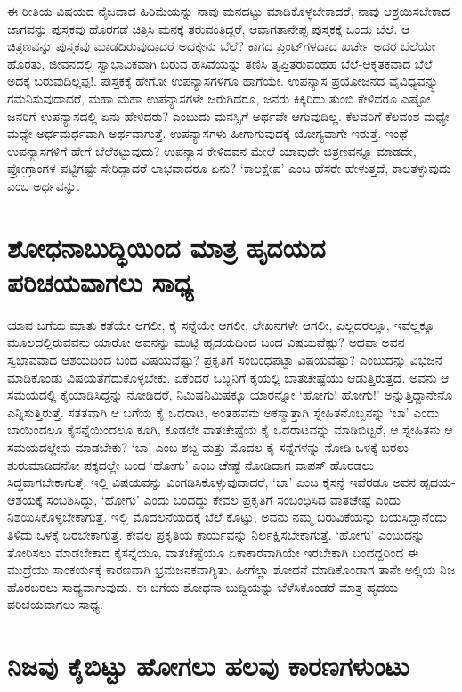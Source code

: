 ಈ ರೀತಿಯ ವಿಷಯದ ನೈಜವಾದ ಹಿರಿಮೆಯನ್ನು ನಾವು ಮನದಟ್ಟು ಮಾಡಿಕೊಳ್ಳಬೇಕಾದರೆ, ನಾವು ಆಶ್ರಯಿಸಬೇಕಾದ ಜಾಗವನ್ನು ಪುಸ್ತಕವು ಹೊರಗಡೆ ಚಿತ್ರಿಸಿ ಮನಕ್ಕೆ ತರುವಂತಿದ್ದರೆ, ಆವಾಗತಾನೇಪ್ಪ ಪುಸ್ತಕಕ್ಕೆ ಒಂದು ಬೆಲೆ. ಆ ಚಿತ್ರಣವನ್ನು ಪುಸ್ತಕವು ಮಾಡದಿರುವುದಾದರೆ ಅದಕ್ಕೇನು ಬೆಲೆ? ಕಾಗದ ಪ್ರಿಂಟ್‌ಗಳದಾದ ಖರ್ಚೇ ಅದರ ಬೆಲೆಯೇ ಹೊರತು, ಜೀವನದಲ್ಲಿ ಸ್ವಾಭಾವಿಕವಾಗಿ ಬರುವ ಹಸಿವೆಯನ್ನು ತಣಿಸಿ ತೃಪ್ತಿತರುವಂಥಹ ಬೆಲೆ-ಆಕೃತಕವಾದ ಬೆಲೆ ಅದಕ್ಕೆ ಬರುವುದಿಲ್ಲಪ್ಪ!. ಪುಸ್ತಕಕ್ಕೆ ಹೇಗೋ ಉಪನ್ಯಾಸಗಳಿಗೂ ಹಾಗೆಯೇ. ಉಪನ್ಯಾಸ ಪ್ರಯೋಜನದ ವೈವಿಧ್ಯವನ್ನ್ನು ಗಮನಿಸುವುದಾದರೆ, ಮಹಾ ಮಹಾ ಉಪನ್ಯಾಸಗಳೇ ಜರುಗಿದರೂ, ಜನರು ಕಿಕ್ಕಿರಿದು ತುಂಬಿ ಕೇಳಿದರೂ ಎಷ್ಟೋ ಜನರಿಗೆ ಉಪನ್ಯಾಸದಲ್ಲಿ ಏನು ಹೇಳಿದರು? ಎಂಬುದು ಮನಸ್ಸಿಗೆ ಅರ್ಥವೇ ಆಗುವುದಿಲ್ಲ. ಕೆಲವರಿಗೆ ಕೆಲವಂಶ ಮಧ್ಯೇ ಮಧ್ಯೇ ಅರ್ಧಮರ್ಧವಾಗಿ ಅರ್ಥವಾಗುತ್ತೆ. ಉಪನ್ಯಾಸಗಳು ಹೀಗಾಗುವುದಕ್ಕೆ ಯೋಗ್ಯವಾಗೇ ಇರುತ್ತೆ. ಇಂಥೆ ಉಪನ್ಯಾಸಗಳಿಗೆ ಹೇಗೆ ಬೆಲೆಕಟ್ಟುವುದು? ಉಪನ್ಯಾಸ ಕೇಳಿದವನ ಮೇಲೆ ಯಾವುದೇ ಚಿತ್ರಣವನ್ನೂ ಮಾಡದೇ, ಪ್ರೋಗ್ರಾಂಗಳ ಪಟ್ಟಿಗಷ್ಟೇ ಸೇರಿದ್ದಾದರೆ ಲಾಭವಾದರೂ ಏನು? `ಕಾಲಕ್ಷೇಪ' ಎಂಬ ಹೆಸರೇ ಹೇಳುತ್ತದೆ, ಕಾಲತಳ್ಳುವುದು ಎಂಬ ಅರ್ಥವನ್ನು.

\section*{ಶೋಧನಾಬುದ್ಧಿಯಿಂದ ಮಾತ್ರ ಹೃದಯದ ಪರಿಚಯವಾಗಲು ಸಾಧ್ಯ}

ಯಾವ ಬಗೆಯ ಮಾತು ಕತೆಯೇ ಆಗಲೀ, ಕೈ ಸನ್ನೆಯೇ ಆಗಲೀ, ಲೇಖನಗಳೇ ಆಗಲೀ, ಎಲ್ಲದರಲ್ಲೂ, ಇವೆಲ್ಲಕ್ಕೂ ಮೂಲದಲ್ಲಿರುವವನು ಯಾರೋ ಅವನನ್ನು ಮುಟ್ಟಿ ಹೃದಯದಿಂದ ಬಂದ ವಿಷಯವೆಷ್ಟು? ಅಥವಾ ಅವನ ಸ್ವಭಾವವಾದ ಆಶಯದಿಂದ ಬಂದ ವಿಷಯವೆಷ್ಟು? ಪ್ರಕೃತಿಗೆ ಸಂಬಂಧಪಟ್ಟಾ ವಿಷಯವೆಷ್ಟು? ಎಂಬುದನ್ನು ವಿಭಜನೆ ಮಾಡಿಕೊಂಡು ವಿಷಯತೆಗೆದುಕೊಳ್ಳಬೇಕು. ಏಕೆಂದರೆ ಒಬ್ಬನಿಗೆ ಕೈಯಲ್ಲಿ ಬಾತಚೇಷ್ಟೆಯು ಆಡುತ್ತಿರುತ್ತದೆ. ಅವನು ಆ ಸಮಯದಲ್ಲಿ ಕೈಯಾಡಿಸಿದ್ದನ್ನು  ನೋಡಿದರೆ, ನಿಮಿಷನಿಮಿಷಕ್ಕೂ ಯಾರನ್ನೋ `ಹೋಗು! ಹೋಗು!' ಅನ್ನುತ್ತಿದ್ದಾನೇನೊ ಎನ್ನಿಸುತ್ತಿರುತ್ತೆ. ಸತತವಾಗಿ ಆ ಬಗೆಯ ಕೈ ಒದರಾಟ, ಅಂತಹವನು ಅಕಸ್ಮಾತ್ತಾಗಿ ಸ್ನೇಹಿತನೊಬ್ಬನನ್ನು `ಬಾ' ಎಂದು ಬಾಯಿಂದಲೂ ಕೈಸನ್ನೆಯಿಂದಲೂ ಕೂಗಿ, ಕೂಡಲೇ ವಾತಚೇಷ್ಟೆಯ ಕೈ ಒದರಾಟವನ್ನು ಮಾಡಿಬಿಟ್ಟರೆ, ಆ ಸ್ನೇಹಿತನು ಆ ಸಮಯದಲ್ಲೇನು ಮಾಡಬೇಕು? `ಬಾ' ಎಂಬ ಶಬ್ದ ಮತ್ತು ಮೊದಲ ಕೈ ಸನ್ನೆಗಳನ್ನು ನೋಡಿ ಒಳಕ್ಕೆ ಬರಲು ಶುರುಮಾಡಿದನೋ ಪಕ್ಕದಲ್ಲೇ ಬಂದ `ಹೋಗು' ಎಂಬ ಚೇಷ್ಟೆ  ನೋಡಿದಾಗ ವಾಪಸ್ ಹೊರಡಲು ಸಿದ್ಧವಾಗಬೇಕಾಗುತ್ತೆ. ಇಲ್ಲಿ ವಿಷಯವನ್ನು ವಿಂಗಡಿಸಿಕೊಳ್ಳುವುದಾದರೆ, `ಬಾ' ಎಂಬ ಕೈಸನ್ನೆ ಇವೆರಡೂ ಅವನ ಹೃದಯ-ಆಶಯಕ್ಕೆ ಸಂಬಶಿಸಿದ್ದು, `ಹೋಗು' ಎಂದು ಬಂದದ್ದು ಕೇವಲ ಪ್ರಕೃತಿಗೆ ಸಂಬಂಧಿಸಿದ ವಾತಚೇಷ್ಟೆ ಎಂದು ನಿಶಯಿಸಿಕೊಳ್ಳಬೇಕಾಗುತ್ತೆ. ಇಲ್ಲಿ ಮೊದಲನೆಯದಕ್ಕೆ ಬೆಲೆ ಕೊಟ್ಟು, ಅವನು ನಮ್ಮ ಬರುವಿಕೆಯನ್ನು ಬಯಸಿದ್ದಾನೆಂದು ತಿಳಿದು ಒಳಕ್ಕೆ  ಬರಬೇಕಾಗುತ್ತೆ. ಕೇವಲ ಪ್ರಕೃತಿಯ ಕಾರ್ಯವನ್ನು ನಿರ್ಲಕ್ಷಿಸಬೇಕಾಗುತ್ತೆ. `ಹೋಗು' ಎಂಬುದನ್ನು ತೋರಿಸಲು ಮಾಡಬೇಕಾದ ಕೈಸನ್ನೆಯೂ, ವಾತಚೆಷ್ಟೆಯೂ ಏಕಾಕಾರವಾಗಿಯೇ ಇರಬೇಕಾಗಿ ಬಂದದ್ದರಿಂದ ಈ ಮುದ್ರೆಯು ಸಾಂಕರ್ಯಕ್ಕೆ ಕಾರಣವಾಗಿ ಭ್ರಮಜನಕವಾಗ್ಯಿತು. ಹೀಗೆಲ್ಲಾ ಶೋಧನೆ ಮಾಡಿಕೊಂಡಾಗ ತಾನೇ ಅಲ್ಲಿಯ ನಿಜ ಹೊರಬರಲು ಸಾಧ್ಯವಾಗುವುದು. ಈ ಬಗೆಯ ಶೋಧನಾ ಬುದ್ದಿಯನ್ನು ಬೆಳೆಸಿಕೊಂಡರೆ ಮಾತ್ರ ಹೃದಯ ಪರಿಚಯವಾಗಲು ಸಾಧ್ಯ. 

\section*{ನಿಜವು ಕೈಬಿಟ್ಟು ಹೋಗಲು ಹಲವು ಕಾರಣಗಳುಂಟು}

